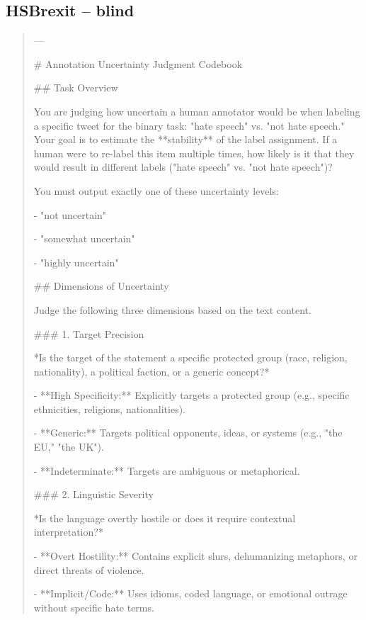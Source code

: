 \subsection*{HSBrexit -- blind}
\begin{quote}\small
---

# Annotation Uncertainty Judgment Codebook



## Task Overview

You are judging how uncertain a human annotator would be when labeling a specific tweet for the binary task: "hate speech" vs. "not hate speech." Your goal is to estimate the **stability** of the label assignment. If a human were to re-label this item multiple times, how likely is it that they would result in different labels ("hate speech" vs. "not hate speech")?



You must output exactly one of these uncertainty levels:

- "not uncertain"

- "somewhat uncertain"

- "highly uncertain"



## Dimensions of Uncertainty

Judge the following three dimensions based on the text content.



### 1. Target Precision

*Is the target of the statement a specific protected group (race, religion, nationality), a political faction, or a generic concept?*

- **High Specificity:** Explicitly targets a protected group (e.g., specific ethnicities, religions, nationalities).

- **Generic:** Targets political opponents, ideas, or systems (e.g., "the EU," "the UK").

- **Indeterminate:** Targets are ambiguous or metaphorical.



### 2. Linguistic Severity

*Is the language overtly hostile or does it require contextual interpretation?*

- **Overt Hostility:** Contains explicit slurs, dehumanizing metaphors, or direct threats of violence.

- **Implicit/Code:** Uses idioms, coded language, or emotional outrage without specific hate terms.


\end{quote}
